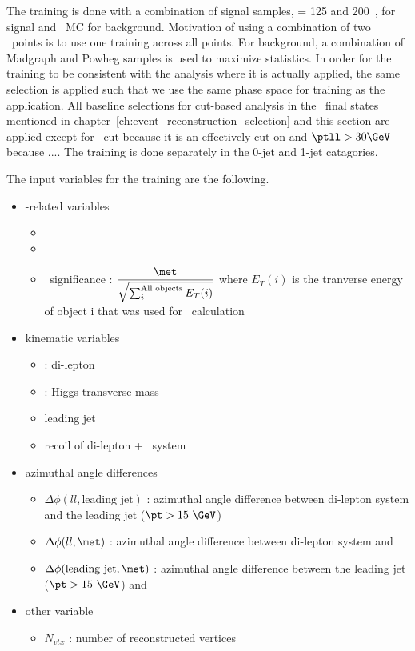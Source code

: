The training is done with a combination of signal samples, \mHi = 125 and 200~\GeV, 
for signal and \dyll\ MC for background. Motivation of using a combination of two 
\mHi\ points is to use one training across all \mHi points. For background, a 
combination of Madgraph and Powheg samples is used to maximize statistics. 
In order for the training to be consistent with the analysis where it is actually 
applied, the same selection is applied such that we use the same phase space 
for training as the application. All baseline selections for cut-based analysis 
in the \SF\ final states mentioned in chapter~\ref{ch:event_reconstruction_selection} 
and this section are applied except for \mT\ cut because it is an effectively cut on \met
and $\ptll>30\GeV$ because .... 
The training is done separately in the 0-jet and 1-jet catagories. 

The input variables for the training are the following. 
\begin{itemize}

%
\item \met-related variables
\begin{itemize}
\item \pmet 
\item \ptrkmet  
\item \met\ significance : 
      $\displaystyle \frac{\met}{\sqrt{\sum_{i}^{\textrm{All objects}} E_T(i)}}$
      where $E_T(i)$ is the tranverse energy of object i that was used for \met\ calculation
\end{itemize}

%
\item kinematic variables
\begin{itemize}
\item \ptll : di-lepton \pt 
\item \mT : Higgs transverse mass 
\item leading jet \pt
\item recoil of di-lepton + \met\ system   
\end{itemize}

%
\item azimuthal angle differences 
\begin{itemize}
\item $\Delta\phi(ll, \textrm{leading jet})$ : azimuthal angle difference between di-lepton system 
      and the leading jet ($\pt>15~\GeV$)
\item $\Delta\phi(ll, \met)$ : azimuthal angle difference between di-lepton system 
      and \met
\item $\Delta\phi(\textrm{leading jet}, \met)$ : azimuthal angle difference between 
      the leading jet ($\pt>15~\GeV$) and \met
\end{itemize}

%
\item other variable
\begin{itemize}
\item $N_{vtx}$ : number of reconstructed vertices 
\end{itemize}

\end{itemize}

